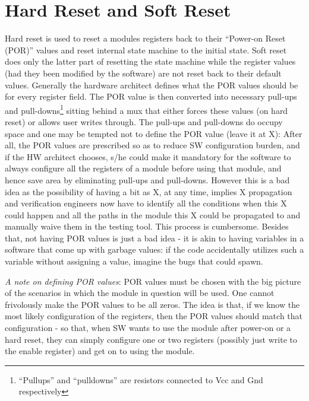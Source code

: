 \section{Hard Reset and Soft Reset}
Hard reset is used to reset a modules registers back to their ``Power-on Reset (POR)'' values and reset internal state machine to the initial state. Soft reset does only the latter part of resetting the state machine while the register values (had they been modified by the software) are not reset back to their default values. Generally the hardware architect defines what the POR values should be for every register field. The POR value is then converted into necessary pull-ups and pull-downs\footnote{``Pullups'' and ``pulldowns'' are resistors connected to Vcc and Gnd respectively} sitting behind a mux that either forces these values (on hard reset) or allows user writes through. The pull-ups and pull-downs do occupy space and one may be tempted not to define the POR value (leave it at X): After all, the POR values are prescribed so as to reduce SW configuration burden, and if the HW architect chooses, s/he could make it mandatory for the software to always configure all the registers of a module before using that module, and hence save area by eliminating pull-ups and pull-downs. However this is a bad idea as the possibility of having a bit as X, at any time, implies X propagation and verification engineers now have to identify all the conditions when this X could happen and all the paths in the module this X could be propagated to and manually waive them in the testing tool. This process is cumbersome. Besides that, not having POR values is just a bad idea - it is akin to having variables in a software that come up with garbage values: if the code accidentally utilizes such a variable without assigning a value, imagine the bugs that could spawn. 

\emph{A note on defining POR values}: POR values must be chosen with the big picture of the scenarios in which the module in question will be used. One cannot frivolously make the POR values to be all zeros. The idea is that, if we know the most likely configuration of the registers, then the POR values should match that configuration - so that, when SW wants to use the module after power-on or a hard reset, they can simply configure one or two registers (possibly just write to the enable register) and get on to using the module.

